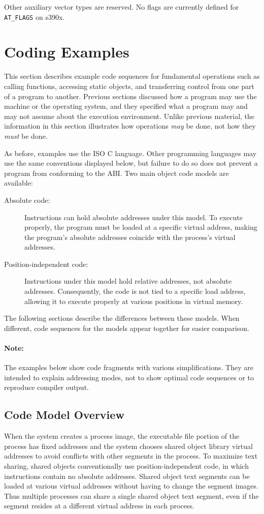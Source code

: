 \documentclass[USenglish,fontsize=11pt,twoside,%
  toc=bib,toc=idx,toc=graduated,numbers=noendperiod,
  bookmarks=true,
  bookmarksnumbered=true,
  bookmarksopen=true,
  bookmarksopenlevel=1,
  breaklinks=true,
  colorlinks=true,
  linkcolor=black,
  pdfpagelayout={TwoPageRight},
  pdfusetitle=true
]{scrreprt}
\newcommand{\ABINAME}{s390x}
\newcommand{\ABINAME}{s390}
\begin{document}
Other auxiliary vector types are reserved.  No flags are currently
defined for \texttt{AT\_FLAGS} on \ABINAME{}.

\section{Coding Examples}
\label{codingexamples}
This section describes example code sequences for fundamental
operations such as calling functions, accessing static objects, and
transferring control from one part of a program to another.  Previous
sections discussed how a program may use the machine or the operating
system, and they specified what a program may and may not assume about
the execution environment.  Unlike previous material, the information
in this section illustrates how operations \emph{may} be done,
not how they \emph{must} be done.

As before, examples use the ISO C language.  Other programming
languages may use the same conventions displayed below, but failure to
do so does not prevent a program from conforming to the ABI\@.  Two main
object code models are available:
\begin{description}
\item[Absolute code:] Instructions can hold absolute addresses under
  this model.  To execute properly, the program must be loaded at a
  specific virtual address, making the program's absolute addresses
  coincide with the process's virtual addresses.
\item[Position-independent code:] Instructions under this model hold
  relative addresses, not absolute addresses.  Consequently, the code
  is not tied to a specific load address, allowing it to execute
  properly at various positions in virtual memory.
\end{description}

The following sections describe the differences between these models.
When different, code sequences for the models appear together for
easier comparison.

\paragraph{Note:}
The examples below show code fragments with various simplifications.
They are intended to explain addressing modes, not to show optimal
code sequences or to reproduce compiler output.

\subsection{Code Model Overview}
When the system creates a process image, the executable file
portion of the process has fixed addresses and the system chooses
shared object library virtual addresses to avoid conflicts with other
segments in the process.  To maximize text sharing, shared objects
conventionally use position-independent code, in which instructions
contain no absolute addresses.  Shared object text segments can be
loaded at various virtual addresses without having to change the
segment images.  Thus multiple processes can share a single shared
object text segment, even if the segment resides at a different
virtual address in each process.
\end{document}
